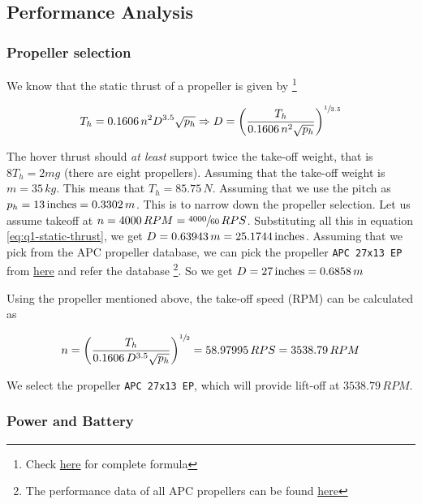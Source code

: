 \subsection{Performance Analysis}

\subsubsection*{Propeller selection}

We know that the static thrust of a propeller is given by
\footnote{Check \href{https://www.electricrcaircraftguy.com/2014/04/propeller-static-dynamic-thrust-equation-background.html}{here} for complete formula}

\begin{equation}
    T_h = 0.1606 \, n^2 D^{3.5} \sqrt{p_h}
    \Rightarrow D = \left ( \frac{T_h}{0.1606 \, n^2 \sqrt{p_h}} \right )^{\sfrac{1}{3.5}}
    \label{eq:q1-static-thrust}
\end{equation}

The hover thrust should \emph{at least} support twice the take-off weight, that is $8 T_h = 2 mg$ (there are eight propellers). Assuming that the take-off weight is $m = 35\,kg$. This means that $T_h = 85.75\,N$.
Assuming that we use the pitch as $p_h=13\,\textup{inches}=0.3302\,m$. This is to narrow down the propeller selection.
Let us assume takeoff at $n=4000\,RPM=\sfrac{4000}{60}\,RPS$. Substituting all this in equation \ref{eq:q1-static-thrust}, we get $D = 0.63943\,m = 25.1744\,\textup{inches}$.
Assuming that we pick from the APC propeller database, we can pick the propeller \texttt{APC 27x13 EP} from \href{https://www.apcprop.com/product/27x13ep/}{here} and refer the database \footnote{The performance data of all APC propellers can be found \href{https://www.apcprop.com/technical-information/performance-data/}{here}}. So we get $D = 27\,\textup{inches} = 0.6858\,m$

Using the propeller mentioned above, the take-off speed (RPM) can be calculated as

\begin{equation*}
    n = \left ( \frac{T_h}{0.1606 \, D^{3.5} \sqrt{p_h}} \right )^{\sfrac{1}{2}} = 58.97995 \, RPS = 3538.79 \, RPM
\end{equation*}

\noindent
We select the propeller \texttt{APC 27x13 EP}, which will provide lift-off at $3538.79 \, RPM$.

\subsubsection*{Power and Battery}

